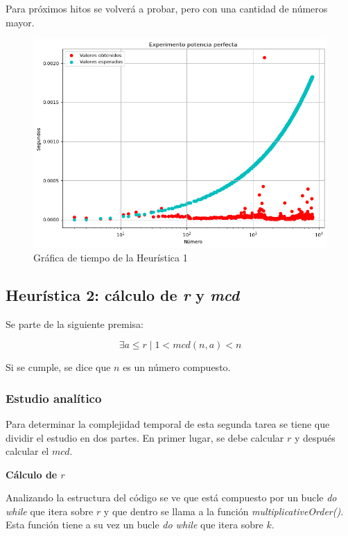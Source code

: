 \documentclass{uc3mpracticas}
\begin{document}
Para próximos hitos se volverá a probar, pero con una cantidad de números mayor.

\begin{figure}[!h]
  \centering
  \includegraphics[width=.8\linewidth]{./Images/h1.png}
  \caption{Gráfica de tiempo de la Heurística 1}
  \label{fig:h1}
\end{figure}



\subsection{Heurística 2: cálculo de \textit{r} y \textit{mcd}}

Se parte de la siguiente premisa:

$$ \exists a \leq r \mid 1 < mcd(n,a) < n $$

Si se cumple, se dice que $n$ es un número compuesto.


\subsubsection{Estudio analítico}
Para determinar la complejidad temporal de esta segunda tarea se tiene que dividir el estudio en dos partes. En primer lugar, se debe calcular $r$ y después calcular el $mcd$.

\vspace{4mm}

\textbf{Cálculo de $r$}

\vspace{2mm}


Analizando la estructura del código se ve que está compuesto por un bucle \textit{do while} que itera sobre $r$ y que dentro se llama a la función \textit{multiplicativeOrder()}. Esta función tiene a su vez un bucle \textit{do while} que itera sobre $k$.
\end{document}
